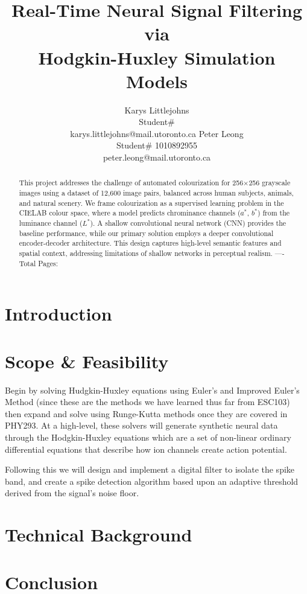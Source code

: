 \documentclass{article} %
\title{Real-Time Neural Signal Filtering via \\
Hodgkin-Huxley Simulation Models}
\author{Karys Littlejohns\\
Student\# \\
karys.littlejohns@mail.utoronto.ca
\And
Peter Leong \\
Student\# 1010892955 \\
peter.leong@mail.utoronto.ca \\
\AND
}
\begin{document}
\maketitle

\vspace{-6ex}

\begin{abstract}
This project addresses the challenge of automated colourization for 256$\times$256 grayscale images using a dataset of 12,600 image pairs, balanced across human subjects, 
animals, and natural scenery. We frame colourization as a supervised learning problem in the CIELAB colour space, where a model predicts chrominance channels ($a^*$, $b^*$) 
from the luminance channel ($L^*$). A shallow convolutional neural network (CNN) provides the baseline performance, while our primary solution employs a deeper convolutional 
encoder-decoder architecture. This design captures high-level semantic features and spatial context, addressing limitations of shallow networks in perceptual realism.
----Total Pages: \pageref{last_page}
\end{abstract}

\vspace{2ex}

\begin{multicols}{2}

\section{Introduction}

\section{Scope \& Feasibility}

Begin by solving Hudgkin-Huxley equations using Euler's and Improved Euler's Method (since these are the methods we have learned thus far from ESC103)
then expand and solve using Runge-Kutta methods once they are covered in PHY293. At a high-level, these solvers will generate synthetic neural data through
the Hodgkin-Huxley equations which are a set of non-linear ordinary differential equations that describe how ion channels create action potential.

Following this we will design and implement a digital filter to isolate the spike band, and create a spike detection algorithm based upon an adaptive threshold
derived from the signal's noise floor.

\section{Technical Background}

\section{Conclusion}

\label{last_page}

\newpage



\end{multicols}
\end{document}
